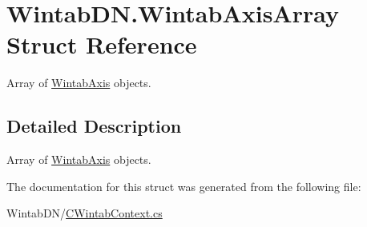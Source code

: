 \hypertarget{struct_wintab_d_n_1_1_wintab_axis_array}{}\section{Wintab\+D\+N.\+Wintab\+Axis\+Array Struct Reference}
\label{struct_wintab_d_n_1_1_wintab_axis_array}


Array of \mbox{\hyperlink{struct_wintab_d_n_1_1_wintab_axis}{Wintab\+Axis}} objects.  




\subsection{Detailed Description}
Array of \mbox{\hyperlink{struct_wintab_d_n_1_1_wintab_axis}{Wintab\+Axis}} objects. 



The documentation for this struct was generated from the following file\+:\begin{DoxyCompactItemize}
\item 
Wintab\+D\+N/\mbox{\hyperlink{_c_wintab_context_8cs}{C\+Wintab\+Context.\+cs}}\end{DoxyCompactItemize}
